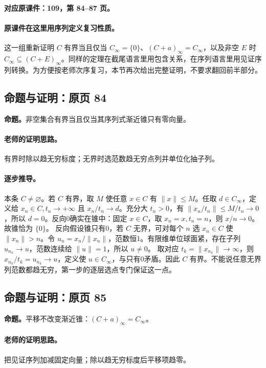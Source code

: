 \documentclass[11pt,a4paper]{article}
\theoremstyle{definition}\newtheorem{definition}{定义}\newtheorem{example}{例}
\begin{document}
\textbf{对应原课件：109，第 84--87 页。}


\paragraph{原课件在这里用序列定义复习性质。}
这一组重新证明 $C$ 有界当且仅当 $C_\infty=\{0\}$、$(C+a)_\infty=C_\infty$，以及非空 $E$ 时 $C_\infty\subseteq(C+E)_\infty$。同样的定理在截尾语言里用包含关系，在序列语言里用见证序列转换。为方便按老师次序复习，本节再次给出完整证明，不要求翻回前半部分。


\subsection{命题与证明：原页 84}

\textbf{命题。}非空集合有界当且仅当其序列式渐近锥只有零向量。

\paragraph{老师的证明思路。}有界时除以趋无穷标度；无界时选范数趋无穷点列并单位化抽子列。

\paragraph{逐步推导。}
本条 $C\ne\varnothing$。若 $C$ 有界，取 $M$ 使任意 $x\in C$ 有 $\|x\|\le M$。任取 $d\in C_\infty$，定义给 $x_n\in C,t_n\to+\infty$ 且 $x_n/t_n\to d$。充分大 $t_n>0$，有 $\|x_n/t_n\|\le M/t_n\to0$，所以 $d=0$。反向0确实在锥中：固定 $x\in C$，取 $x_n=x,t_n=n$，则 $x/n\to0$。故锥恰为 $\{0\}$。
反向假设锥只有0，若 $C$ 无界，可对每个 $n$ 选 $x_n\in C$ 使 $\|x_n\|>n$。令 $u_n=x_n/\|x_n\|$，范数恒1。有限维单位球面紧，存在子列 $u_{n_k}\to u$，范数连续给 $\|u\|=1$，所以 $u\ne0$。
取对应 $t_k=\|x_{n_k}\|\to\infty$，则 $x_{n_k}/t_k=u_{n_k}\to u$，定义使 $u\in C_\infty$，与只有0矛盾。因此 $C$ 有界。不能说任意无界列范数都趋无穷，第一步的逐层选点专门保证这一点。


\subsection{命题与证明：原页 85}

\textbf{命题。}平移不改变渐近锥：$(C+a)_\infty=C_\infty$。

\paragraph{老师的证明思路。}把见证序列加减固定向量；除以趋无穷标度后平移项趋零。
\end{document}
